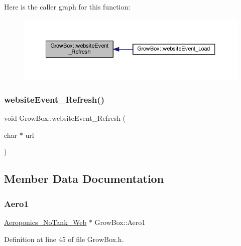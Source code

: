 Here is the caller graph for this function\+:
\nopagebreak
\begin{figure}[H]
\begin{center}
\leavevmode
\includegraphics[width=350pt]{class_grow_box_aa75f2898bbac66ab08cb257e4285f51e_icgraph}
\end{center}
\end{figure}
\mbox{\label{class_grow_box_aa75f2898bbac66ab08cb257e4285f51e}} 
\subsubsection{\texorpdfstring{website\+Event\+\_\+\+Refresh()}{websiteEvent\_Refresh()}\hspace{0.1cm}{\footnotesize\ttfamily [2/2]}}
{\footnotesize\ttfamily void Grow\+Box\+::website\+Event\+\_\+\+Refresh (\begin{DoxyParamCaption}\item[{char $\ast$}]{url }\end{DoxyParamCaption})}



\subsection{Member Data Documentation}
\mbox{\label{class_grow_box_a7d1dc60bd64a668b7716696cdc67b560}} 
\subsubsection{\texorpdfstring{Aero1}{Aero1}}
{\footnotesize\ttfamily \hyperlink{class_aeroponics___no_tank___web}{Aeroponics\+\_\+\+No\+Tank\+\_\+\+Web} $\ast$ Grow\+Box\+::\+Aero1}



Definition at line 45 of file Grow\+Box.\+h.

